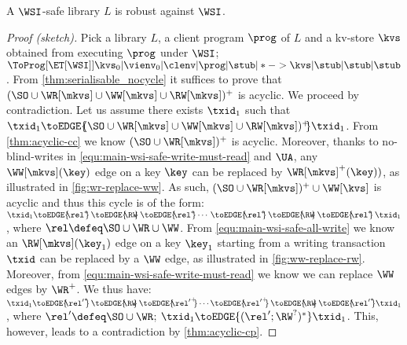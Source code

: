 \begin{theorem}
 \label{thm:main-wsi-robust}
    A \(\WSI\)-safe library \( L \) is robust against \(\WSI\).   
\end{theorem}
\SpaceBelowDef
%

%
\begin{proof}[Proof (sketch)]
Pick a library \( L \), a client program \( \prog \) of  $L$ and a kv-store \( \kvs \) obtained from executing \( \prog \) under $\WSI$;
\ie \( \ToProg[{\ET[\WSI]}]{\kvs_0 | \vienv_0 | \clenv | \prog | \stub | * -> \kvs | \stub | \stub | \stub }\).
From \cref{thm:serialisable_nocycle} it suffices to prove that $(\SO \cup \WR[\mkvs] \cup \WW[\mkvs] \cup \RW[\mkvs])^{+}$ is acyclic.
We proceed by contradiction.
Let us assume there exists $\txid_1$ such that $\txid_1 \toEDGE{\!\!(\SO \cup \WR[\mkvs] \cup \WW[\mkvs] \cup \RW[\mkvs])^{+}\!\!} \txid_1$. 
From \cref{thm:acyclic-cc} we know \( (\SO \cup \WR[\mkvs])^{+} \) is acyclic.
Moreover, thanks to no-blind-writes in \eqref{equ:main-wsi-safe-write-must-read} and \( \UA \),
any \( \WW[\mkvs](\key)\) edge on a key \( \key \) can be replaced by \( \WR[\mkvs]^{+}(\key) ) \), 
as illustrated in \cref{fig:wr-replace-ww}.
As such, \( (\SO \cup \WR[\mkvs])^{+} \cup \WW[\kvs]\) is acyclic and thus this cycle is of the form:
\(
    \txid_1 \toEDGE{\!\!\rel^*\!\!} \,\toEDGE{\!\!\RW\!\!}\, \toEDGE{\!\!\rel^*\!\!} \cdots \,\toEDGE{\!\!\rel^*\!\!}\, \toEDGE{\!\!\RW\!\!}\, \toEDGE{\!\!\rel^*\!\!}\, \txid_1
\),
where \( \rel \defeq \SO \cup \WR \cup \WW \).
From \eqref{equ:main-wsi-safe-all-write} we know 
an \( \RW[\mkvs](\key_1) \) edge on a key \( \key_1 \) starting from 
a writing transaction \( \txid \) can be replaced by a \( \WW \) edge,
as illustrated in \cref{fig:ww-replace-rw}.
Moreover, from \eqref{equ:main-wsi-safe-write-must-read} we know we can replace \( \WW \) edges by \( \WR^+ \).
We thus have:
\(
    \txid_1 \toEDGE{\!\!{\rel'}^*\!\!} \,\toEDGE{\!\!\RW\!\!}\, \toEDGE{\!\!{\rel'}^+\!\!} \cdots \toEDGE{\!\!{\rel'}^+\!\!} \,\toEDGE{\!\!\RW\!\!} \,\toEDGE{\!\!{\rel'}^*\!\!} \txid_1
\),
where \( \rel' \defeq \SO \cup \WR  \);
\ie \( \txid_1 \toEDGE{( \rel'; \RW^? )^* } \txid_1 \).
This, however, leads to a contradiction by \cref{thm:acyclic-cp}.
\renewcommand{\qed}{}
\end{proof}


